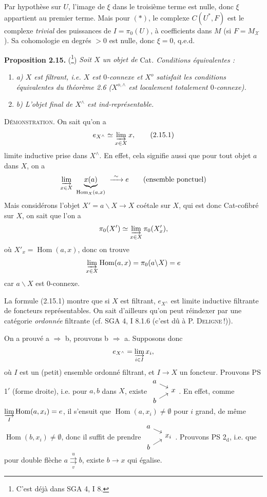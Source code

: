 \documentclass[11pt]{article}
\newcommand{\printedpage}[1]{\marginpar{\footnotesize p.~#1}}
\newcommand{\msp}[1]{\marginpar{\footnotesize [#1]}}
\newcommand{\Hom}{\operatorname{Hom}}
\begin{document}
\printedpage{20}

Par hypothèse sur $U$, l'image de $\xi$ dans le troisième terme est nulle, donc $\xi$ appartient au premier terme. Mais pour $(*)$, le complexe $C(U^*,F)$ est le complexe \textit{trivial} des puissances de $I=\pi_0(U)$, à coefficients dans $M$ (si $F=M_{\mathcal{X}}$). Sa cohomologie \msp{page 32} en degrés $>0$ est nulle, donc $\xi=0$, q.e.d.

\noindent\textbf{Proposition 2.15.} (\footnote[39]{C'est déjà dans SGA 4, I 8.}) \textit{Soit $X$ un objet de} Cat\textit{. Conditions équivalentes :}
\begin{enumerate}[label={}, leftmargin=2em, itemsep=0pt]
\item \textit{a) $X$ est filtrant, i.e. $X$ est $0$-connexe et $X^o$ satisfait les conditions équivalentes du théorème 2.6 ($X^{o,\wedge}$ est localement totalement $0$-connexe).}
\item \textit{b) L'objet final de $X^\wedge$ est ind-représentable.}
\end{enumerate}
\noindent\textsc{Démonstration}. On sait qu'on a
\[
e_{X^\wedge} \simeq \varinjlim_{x \in X} x, \tag*{(2.15.1)}
\]
limite inductive prise dans $X^\wedge$. En effet, cela signifie aussi que pour tout objet $a$ dans $X$, on a
\[
\varinjlim_{x \in X} \ \underbrace{x(a)}_{\Hom_X(a,x)} \ \xrightarrow{\ \sim\ } e \qquad \text{(ensemble ponctuel)}
\]
Mais considérons l'objet $X' = a\backslash X \longrightarrow X$ coétale sur $X$, qui est donc Cat-cofibré sur $X$, on sait que l'on a
\[
\pi_0(X') \simeq \varinjlim_{x \in X} \pi_0(X'_x),
\]
où $X'_x = \Hom(a,x)$, donc on trouve
\[
\varinjlim_{x \in X} \Hom(a,x) = \pi_0(a\backslash X) = e
\]
car $a\backslash X$ est 0-connexe.

La formule (2.15.1) montre que si \msp{page 33} $X$ est filtrant, $e_{X^\wedge}$ est limite inductive filtrante de foncteurs représentables. On sait d'ailleurs qu'on peut réindexer par une catégorie \textit{ordonnée} filtrante (cf. SGA 4, I 8.1.6 (c'est dû à P. \textsc{Deligne}\,!)).

On a prouvé a $\Longrightarrow$ b, prouvons b $\Longrightarrow$ a. Supposons donc
\[
e_{X^\wedge} = \varinjlim_{i \in I} x_i,
\]
où $I$ est un (petit) ensemble ordonné filtrant, et $I \longrightarrow X$ un foncteur. Prouvons PS 1$'$ (forme droite), i.e. pour $a, b$ dans $X$, existe $\vcenter{\hbox{\begin{tikzcd}[row sep=0.1em, column sep=1.2em]
a \arrow[dr] & \\
& x \\
b \arrow[ur] &
\end{tikzcd}}}$. En effet, comme $\varinjlim\limits_{I} \Hom(a,x_i) = e$, il s'ensuit que $\Hom(a,x_i) \neq \emptyset$ pour $i$ grand, de même $\Hom(b,x_i) \neq \emptyset$, donc il suffit de prendre $\vcenter{\hbox{\begin{tikzcd}[row sep=0.1em, column sep=1.2em]
a \arrow[dr] & \\
& x_i \\
b \arrow[ur] &
\end{tikzcd}}}$. Prouvons PS 2$_{\mathrm{d}}$, i.e. que pour double flèche $a \overset{u}{\underset{v}{\rightrightarrows}} b$, existe $b \longrightarrow x$ qui égalise.
\end{document}
